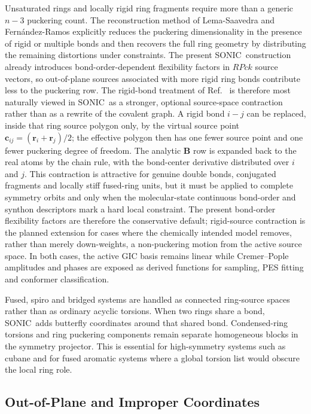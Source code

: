 \documentclass[journal=jctcce,manuscript=article,layout=traditional]{achemso}
\newcommand{\SONIC}{SONIC}
\newcommand{\Bmat}{\mathbf{B}}
\theoremstyle{definition}
\begin{document}
Unsaturated rings and locally rigid ring fragments require more than a generic
\(n-3\) puckering count.  The reconstruction method of Lema-Saavedra and
Fern{\'a}ndez-Ramos explicitly reduces the puckering dimensionality in the
presence of rigid or multiple bonds and then recovers the full ring geometry by
distributing the remaining distortions under constraints.\cite{LemaSaavedraFernandezRamos2026RingCP}
The present \SONIC\ construction already introduces bond-order-dependent
flexibility factors in \(RPck\) source vectors, so out-of-plane sources
associated with more rigid ring bonds contribute less to the puckering row.
The rigid-bond treatment of
Ref.~ is therefore most naturally
viewed in \SONIC\ as a stronger, optional source-space contraction rather than as
a rewrite of the covalent graph.  A rigid bond \(i-j\) can be replaced, inside
that ring source polygon only, by the virtual source point
\(\mathbf{c}_{ij}=(\mathbf{r}_i+\mathbf{r}_j)/2\); the effective polygon then
has one fewer source point and one fewer puckering degree of freedom.  The
analytic \(\Bmat\) row is expanded back to the real atoms by the chain rule,
with the bond-center derivative distributed over \(i\) and \(j\).  This
contraction is attractive for genuine double bonds, conjugated fragments and
locally stiff fused-ring units, but it must be applied to complete symmetry
orbits and only when the molecular-state continuous bond-order and synthon
descriptors mark a hard local constraint.  The present bond-order flexibility factors are
therefore the conservative default; rigid-source contraction is the planned
extension for cases where the chemically intended model removes, rather than
merely down-weights, a non-puckering motion from the active source space.  In
both cases, the active GIC basis remains linear while Cremer--Pople amplitudes
and phases are exposed as derived functions for sampling, PES fitting and
conformer classification.

Fused, spiro and bridged systems are handled as connected ring-source spaces
rather than as ordinary acyclic torsions.  When two rings share a bond, \SONIC\
adds butterfly coordinates around that shared bond.  Condensed-ring torsions
and ring puckering components remain separate homogeneous blocks in the
symmetry projector.  This is essential for high-symmetry systems such as cubane
and for fused aromatic systems where a global torsion list would obscure the
local ring role.

\subsection{Out-of-Plane and Improper Coordinates}
\end{document}

